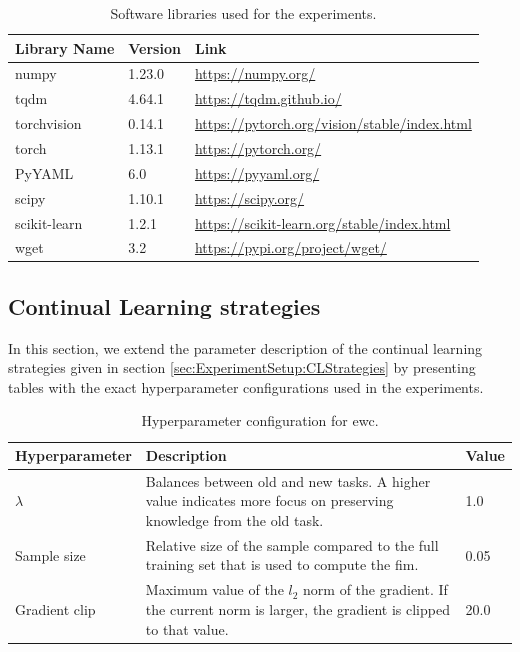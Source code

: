 \begin{table}[!htb]
    \centering
    \begin{tabular}{|l || l | l |} 
        \hline
        Library Name & Version & Link \\ 
        \hline 
        \hline
        numpy & 1.23.0 & \url{https://numpy.org/} \\
        \hline
        tqdm & 4.64.1 & \url{https://tqdm.github.io/}  \\
        \hline
        torchvision & 0.14.1 & \url{https://pytorch.org/vision/stable/index.html} \\ 
        \hline
        torch & 1.13.1 & \url{https://pytorch.org/} \\
        \hline
        PyYAML & 6.0 & \url{https://pyyaml.org/} \\
        \hline
        scipy & 1.10.1 & \url{https://scipy.org/} \\
        \hline
        scikit-learn & 1.2.1 & \url{https://scikit-learn.org/stable/index.html} \\
        \hline
        wget & 3.2 & \url{https://pypi.org/project/wget/} \\
        \hline
    \end{tabular}
    \caption{Software libraries used for the experiments.}
    \label{fig:Libraries}
\end{table}

\subsection{Continual Learning strategies}
\label{sec:Appendix:CLStrategies}
In this section, we extend the parameter description of the continual learning strategies given in section 
\ref{sec:ExperimentSetup:CLStrategies} by presenting tables with the exact hyperparameter configurations
used in the experiments.

\begin{table}[!htb]
    \begin{tabularx}{\textwidth}{|l | X | l |} 
        \hline
        Hyperparameter & Description & Value \\ 
        \hline 
        \hline
        $\lambda$ & Balances between old and new tasks. A higher value indicates more focus 
        on preserving knowledge from the old task. & 1.0  \\ 
        \hline
        Sample size & Relative size of the sample compared to the full training set that is used to 
        compute the \gls{fim}. & 0.05  \\ 
        \hline
        Gradient clip & Maximum value of the $l_2$ norm of the gradient. If the current norm is larger,
        the gradient is clipped to that value. & 20.0 \\ 
        \hline
    \end{tabularx}
    \caption{Hyperparameter configuration for \gls{ewc}.}
    \label{fig:EWCparams}
\end{table}

